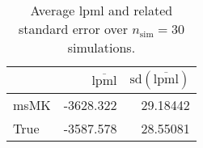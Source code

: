 \begin{table}[H]

\caption{Average lpml and related standard error over $n_{\text{sim}} = 30$ simulations.}
\centering
\begin{tabular}[t]{lrr}
\toprule
  & $\overbar{\text{lpml}}$ & $\text{sd}(\overbar{\text{lpml}})$\\
\midrule
msMK & -3628.322 & 29.18442\\
True & -3587.578 & 28.55081\\
\bottomrule
\end{tabular}
\end{table}